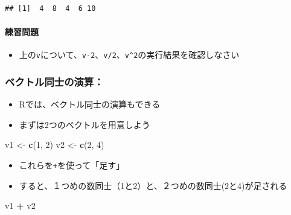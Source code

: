 \documentclass[
]{book}
\newenvironment{Shaded}{\begin{snugshade}}{\end{snugshade}}
\newcommand{\DecValTok}[1]{\textcolor[rgb]{0.00,0.00,0.81}{#1}}
\newcommand{\FunctionTok}[1]{\textcolor[rgb]{0.13,0.29,0.53}{\textbf{#1}}}
\newcommand{\NormalTok}[1]{#1}
\newcommand{\OtherTok}[1]{\textcolor[rgb]{0.56,0.35,0.01}{#1}}
\newcommand{\SpecialCharTok}[1]{\textcolor[rgb]{0.81,0.36,0.00}{\textbf{#1}}}
\providecommand{\tightlist}{%
  \setlength{\itemsep}{0pt}\setlength{\parskip}{0pt}}
\begin{document}
\begin{verbatim}
## [1]  4  8  4  6 10
\end{verbatim}

\hypertarget{ux7df4ux7fd2ux554fux984c-2}{%
\paragraph*{練習問題}\label{ux7df4ux7fd2ux554fux984c-2}}

\begin{itemize}
\tightlist
\item
  上の\texttt{v}について、\texttt{v-2}、\texttt{v/2}、\texttt{v\^{}2}の実行結果を確認しなさい
\end{itemize}

\hypertarget{ux30d9ux30afux30c8ux30ebux540cux58ebux306eux6f14ux7b97}{%
\subsubsection*{ベクトル同士の演算：}\label{ux30d9ux30afux30c8ux30ebux540cux58ebux306eux6f14ux7b97}}

\begin{itemize}
\tightlist
\item
  Rでは、ベクトル同士の演算もできる
\item
  まずは2つのベクトルを用意しよう
\end{itemize}

\begin{Shaded}
\begin{Highlighting}[]
\NormalTok{v1 }\OtherTok{\textless{}{-}} \FunctionTok{c}\NormalTok{(}\DecValTok{1}\NormalTok{, }\DecValTok{2}\NormalTok{) }
\NormalTok{v2 }\OtherTok{\textless{}{-}} \FunctionTok{c}\NormalTok{(}\DecValTok{2}\NormalTok{, }\DecValTok{4}\NormalTok{) }
\end{Highlighting}
\end{Shaded}

\begin{itemize}
\tightlist
\item
  これらを\texttt{+}を使って「足す」
\item
  すると、１つめの数同士（1と2）と、２つめの数同士(2と4)が足される
\end{itemize}

\begin{Shaded}
\begin{Highlighting}[]
\NormalTok{v1 }\SpecialCharTok{+}\NormalTok{ v2}
\end{Highlighting}
\end{Shaded}
\end{document}

